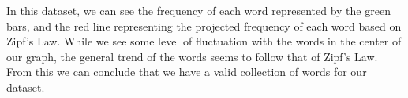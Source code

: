 \documentclass{article}
\begin{document}
In this dataset, we can see the frequency of each word represented by the green bars, and the red line representing the projected frequency of each word based on Zipf's Law. While we see some level of fluctuation with the words in the center of our graph, the general trend of the words seems to follow that of Zipf's Law. From this we can conclude that we have a valid collection of words for our dataset.
\end{document}
